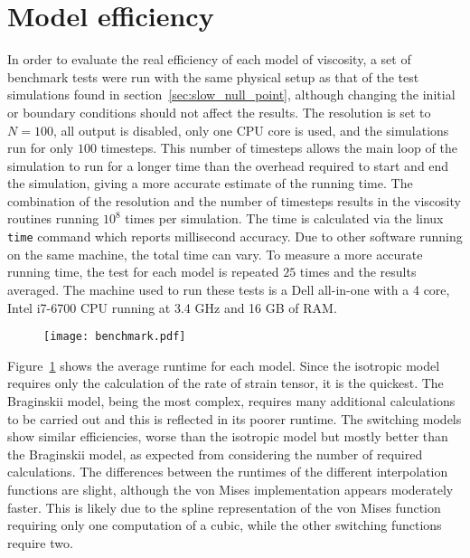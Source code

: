 \section{Model efficiency}

In order to evaluate the real efficiency of each model of viscosity, a set of benchmark tests were run with the same physical setup as that of the test simulations found in section~\ref{sec:slow_null_point}, although changing the initial or boundary conditions should not affect the results. The resolution is set to $N=100$, all output is disabled, only one CPU core is used, and the simulations run for only $100$ timesteps. This number of timesteps allows the main loop of the simulation to run for a longer time than the overhead required to start and end the simulation, giving a more accurate estimate of the running time. The combination of the resolution and the number of timesteps results in the viscosity routines running $10^{8}$ times per simulation. The time is calculated via the linux \verb|time| command which reports millisecond accuracy. Due to other software running on the same machine, the total time can vary. To measure a more accurate running time, the test for each model is repeated $25$ times and the results averaged. The machine used to run these tests is a Dell all-in-one with a 4 core, Intel i7-6700 CPU running at 3.4 GHz and 16 GB of RAM. 

\begin{figure}[t]
  \centering
  \texttt{[image: benchmark.pdf]}
  \label{fig:benchmark}
\end{figure}

Figure~\ref{fig:benchmark} shows the average runtime for each model. Since the isotropic model requires only the calculation of the rate of strain tensor, it is the quickest. The Braginskii model, being the most complex, requires many additional calculations to be carried out and this is reflected in its poorer runtime. The switching models show similar efficiencies, worse than the isotropic model but mostly better than the Braginskii model, as expected from considering the number of required calculations. The differences between the runtimes of the different interpolation functions are slight, although the von Mises implementation appears moderately faster. This is likely due to the spline representation of the von Mises function requiring only one computation of a cubic, while the other switching functions require two.

